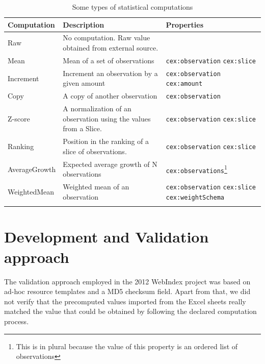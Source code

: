 \documentclass{llncs}
\begin{document}
\begin{savenotes}
\begin{table}[t]
\begin{center}
\begin{tabular}{ p{} p{} p{}}
\toprule
Computation & Description & Properties \\
\hline
Raw			& No computation. Raw value obtained from external source.
			&  \\
Mean	    & Mean of a set of observations 
			& \lstinline|cex:observation| \newline 
			  \lstinline|cex:slice| \\
Increment	& Increment an observation by a given amount 
			& \lstinline|cex:observation| \newline 
			  \lstinline|cex:amount|  \\
Copy		& A copy of another observation 
			& \lstinline|cex:observation| \\
Z-score		& A normalization of an observation using the values from a Slice. 
			& \lstinline|cex:observation| \newline 
			  \lstinline|cex:slice| \\
Ranking		& Position in the ranking of a slice of observations. 
			& \lstinline|cex:observation| \newline 
			  \lstinline|cex:slice| \\
AverageGrowth & Expected average growth of N observations
			  & \lstinline|cex:observations|\footnote{This is in plural because the value of this property is an ordered list of observations} \\
WeightedMean & Weighted mean of an observation
			& \lstinline|cex:observation| \newline
			  \lstinline|cex:slice|       \newline
			  \lstinline|cex:weightSchema| \\
\bottomrule\\
\end{tabular}
\end{center}
\caption{Some types of statistical computations}\label{table:computations}
\end{table}
 \end{savenotes}
\section{Development and Validation approach}

The validation approach employed in the 2012 WebIndex project was based on ad-hoc resource templates and a MD5 checksum field. 
 Apart from that, we did not verify that the precomputed values imported from
 the Excel sheets really matched the value that could be obtained by 
 following the declared computation process.
\end{document}
